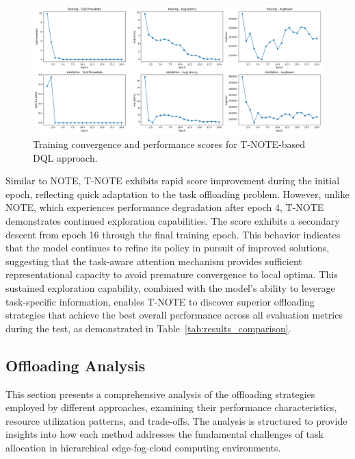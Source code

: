 \documentclass[preprint,3p,authoryear]{elsarticle}
\begin{document}
\begin{figure}[H]
    \centering
    \includegraphics[width=1\linewidth]{figs/T-NOTE/score_plot.png}
    \caption{Training convergence and performance scores for T-NOTE-based DQL approach.}
    \label{fig:T-NOTE-score-plot}
\end{figure}

Similar to NOTE, T-NOTE exhibits rapid score improvement during the initial epoch, reflecting quick adaptation to the task offloading problem. However, unlike NOTE, which experiences performance degradation after epoch 4, T-NOTE demonstrates continued exploration capabilities. The score exhibits a secondary descent from epoch 16 through the final training epoch. This behavior indicates that the model continues to refine its policy in pursuit of improved solutions, suggesting that the task-aware attention mechanism provides sufficient representational capacity to avoid premature convergence to local optima. This sustained exploration capability, combined with the model's ability to leverage task-specific information, enables T-NOTE to discover superior offloading strategies that achieve the best overall performance across all evaluation metrics during the test, as demonstrated in Table~\ref{tab:results_comparison}.


\subsection{Offloading Analysis}\label{subsec:offloading-analysis}

This section presents a comprehensive analysis of the offloading strategies employed by different approaches, examining their performance characteristics, resource utilization patterns, and trade-offs. The analysis is structured to provide insights into how each method addresses the fundamental challenges of task allocation in hierarchical edge-fog-cloud computing environments.
\end{document}
